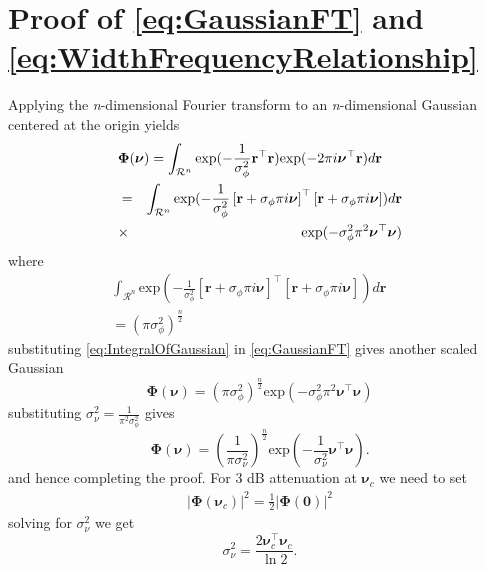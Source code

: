 \documentclass[12pt]{iopart}
\begin{document}
\section{Proof of \ref{eq:GaussianFT} and \ref{eq:WidthFrequencyRelationship} }\label{ap:FrequencyAnalysis}
Applying the \textit{n}-dimensional Fourier transform \cite{Arsac1966} to an \textit{n}-dimensional Gaussian centered at the origin yields
\begin{eqnarray}\label{eq:GaussianFT}
 \lefteqn{\boldsymbol\Phi(\boldsymbol \nu)=\int_{\mathcal R^n}\mathrm{exp}({-\frac{1}{\sigma_{\phi}^2}\mathbf r^\top\mathbf r})\mathrm{exp}(-2\pi i\boldsymbol\nu^\top\mathbf r)d\mathbf r} \nonumber \\
&=&\int_{\mathcal R^n}\mathrm{exp}(-\frac{1}{\sigma_{\phi}^2}\left[\mathbf r +\sigma_{\phi}\pi i \boldsymbol\nu\right]^\top\left[\mathbf r +\sigma_{\phi}\pi i \boldsymbol\nu\right])d\mathbf r \nonumber \\
&\times& \mathrm{exp}(-\sigma_{\phi}^2\pi^2\boldsymbol\nu^\top \boldsymbol\nu)
\end{eqnarray}
where 
\begin{eqnarray}\label{eq:IntegralOfGaussian}
\int_{\mathcal R^n}\mathrm{exp}(-\frac{1}{\sigma_{\phi}^2}\left[\mathbf r +\sigma_{\phi}\pi i \boldsymbol\nu\right]^\top\left[\mathbf r +\sigma_{\phi}\pi i \boldsymbol\nu\right])d\mathbf r&& \nonumber \\
=(\pi\sigma_{\phi}^2)^{\frac{n}{2}}&&
\end{eqnarray}
substituting \ref{eq:IntegralOfGaussian} in \ref{eq:GaussianFT} gives another scaled  Gaussian 
\begin{equation}
   \boldsymbol\Phi(\boldsymbol\nu)=(\pi\sigma_{\phi}^2)^{\frac{n}{2}}\mathrm{exp}(-\sigma_{\phi}^2\pi^2\boldsymbol\nu^\top \boldsymbol\nu)
\end{equation}
substituting $\sigma_{\nu}^2=\frac{1}{\pi^2\sigma_{\phi}^2}$ gives 
\begin{equation}
\boldsymbol\Phi(\boldsymbol \nu)=(\frac{1}{\pi\sigma_{\nu}^2})^{\frac{n}{2}}\mathrm{exp}(-\frac{1}{\sigma_{\nu}^2}\boldsymbol\nu^\top \boldsymbol\nu).
\end{equation}
and hence completing the proof. For 3 dB attenuation at $\boldsymbol\nu_c$ we need to set
\begin{eqnarray}
 |\boldsymbol\Phi(\boldsymbol\nu_c)|^2=\frac{1}{2}|\boldsymbol\Phi(\mathbf 0)|^2
\end{eqnarray}
solving for $\sigma_{\nu}^2$ we get
\begin{equation}
 \sigma_{\nu}^2=\frac{2\boldsymbol\nu_c^\top \boldsymbol\nu_c}{\ln 2 }.
\end{equation}
\end{document}
